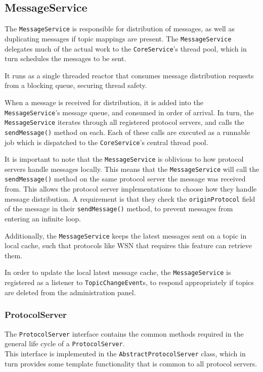 \subsection{MessageService}
\label{subsec:architecture_and_implementation-implementation-core-messageservice}

The \verb!MessageService! is responsible for distribution of messages, as well as duplicating messages if topic mappings are present. The \verb!MessageService! delegates much of the actual work to the \verb!CoreService!'s thread pool, which in turn schedules the messages to be sent.

It runs as a single threaded reactor that consumes message distribution requests from a blocking queue, securing thread safety.

When a message is received for distribution, it is added into the \verb!MessageService!'s message queue, and consumed in order of arrival. In turn, the \verb!MessageService! iterates through all registered protocol servers, and calls the \verb!sendMessage()! method on each. Each of these calls are executed as a runnable job which is dispatched to the \verb!CoreService!'s central thread pool.

It is important to note that the \verb!MessageService! is oblivious to how protocol servers handle messages locally. This means that the \verb!MessageService! will call the \verb!sendMessage()! method on the same protocol server the message was received from. This allows the protocol server implementations to choose how they handle message distribution. A requirement is that they check the \verb!originProtocol! field of the message in their \verb!sendMessage()! method, to prevent messages from entering an infinite loop.

Additionally, the \verb!MessageService! keeps the latest messages sent on a topic in local cache, such that protocols like WSN that requires this feature can retrieve them.

In order to update the local latest message cache, the \verb!MessageService! is registered as a listener to \verb!TopicChangeEvent!s, to respond appropriately if topics are deleted from the administration panel.

\subsubsection{ProtocolServer}
\label{subsec:architecture_and_implementation-implementation-core-protocolserver}

The \verb!ProtocolServer! interface contains the common methods required in the general life cycle of a \verb!ProtocolServer!.\\This interface is implemented in the \verb!AbstractProtocolServer! class, which in turn provides some template functionality that is common to all protocol servers.

